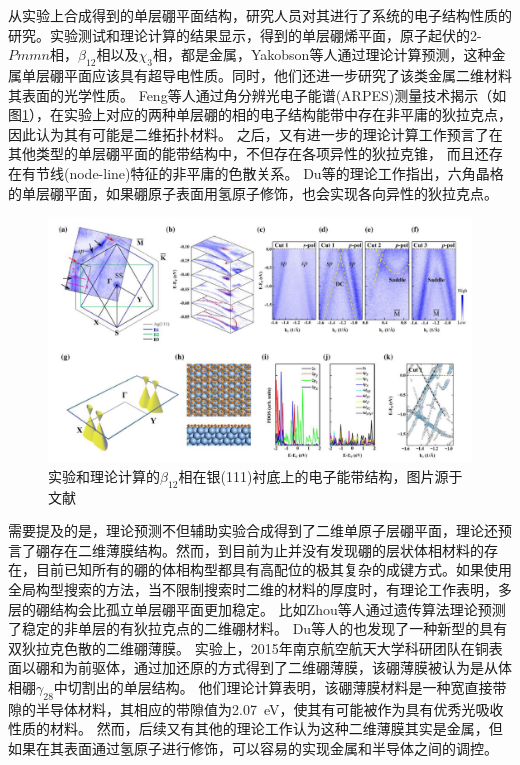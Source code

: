 从实验上合成得到的单层硼平面结构，研究人员对其进行了系统的电子结构性质的研究。实验测试和理论计算的结果显示，得到的单层硼烯平面，原子起伏的2-$Pmmn$相，$\beta_{12}$相以及$\chi_3$相，都是金属\cite{shu2016unveiling}，Yakobson等人\cite{penev2016can}通过理论计算预测，这种金属单层硼平面应该具有超导电性质。同时，他们还进一步研究了该类金属二维材料其表面的光学性质\cite{huang2017two}。
Feng等人\cite{feng2017dirac,feng2018discovery}通过角分辨光电子能谱(ARPES)测量技术揭示（如图\ref{fig:ch1_boron_arpes}），在实验上对应的两种单层硼的相的电子结构能带中存在非平庸的狄拉克点，因此认为其有可能是二维拓扑材料。
之后，又有进一步的理论计算工作预言了在其他类型的单层硼平面的能带结构中，不但存在各项异性的狄拉克锥， 而且还存在有节线(node-line)特征的非平庸的色散关系\cite{zhang2017dirac}。
Du等\cite{jiao2016two}的理论工作指出，六角晶格的单层硼平面，如果硼原子表面用氢原子修饰，也会实现各向异性的狄拉克点。

\begin{figure}[bt]
  \includegraphics[width=1.0\textwidth]{figs/ch1_boron_arpes.png}
  \centering
  \caption{实验和理论计算的$\beta_{12}$相在银(111)衬底上的电子能带结构，图片源于文献\cite{feng2017dirac}}
  \label{fig:ch1_boron_arpes}
\end{figure}

需要提及的是，理论预测不但辅助实验合成得到了二维单原子层硼平面，理论还预言了硼存在二维薄膜结构。然而，到目前为止并没有发现硼的层状体相材料的存在，目前已知所有的硼的体相构型都具有高配位的极其复杂的成键方式。如果使用全局构型搜索的方法，当不限制搜索时二维的材料的厚度时，有理论工作表明，多层的硼结构会比孤立单层硼平面更加稳定。
比如Zhou等人\cite{zhou2014semimetallic}通过遗传算法理论预测了稳定的非单层的有狄拉克点的二维硼材料。
Du等人\cite{ma2016graphene}的也发现了一种新型的具有双狄拉克色散的二维硼薄膜。
实验上，2015年南京航空航天大学科研团队在铜表面以硼和为前驱体，通过加还原的方式得到了二维硼薄膜\cite{tai2015synthesis}，该硼薄膜被认为是从体相硼$\gamma_{28}$中切割出的单层结构。
他们理论计算表明，该硼薄膜材料是一种宽直接带隙的半导体材料，其相应的带隙值为\SI{2.07}{\eV}，使其有可能被作为具有优秀光吸收性质的材料。
然而，后续又有其他的理论工作\cite{kou2016high}认为这种二维薄膜其实是金属，但如果在其表面通过氢原子进行修饰，可以容易的实现金属和半导体之间的调控。

